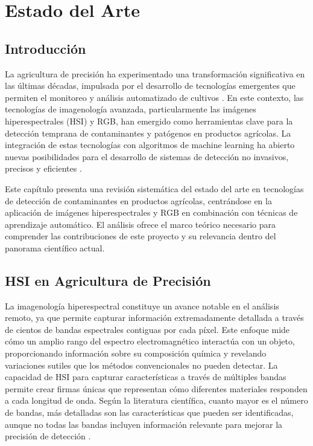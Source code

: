 \chapter{Estado del Arte}

\section{Introducción}

La agricultura de precisión ha experimentado una transformación significativa en las últimas décadas, impulsada por el desarrollo de tecnologías emergentes que permiten el monitoreo y análisis automatizado de cultivos \cite{CISTERNAS2020105626, KHAN2022101678}. En este contexto, las tecnologías de imagenología avanzada, particularmente las imágenes hiperespectrales (HSI) y RGB, han emergido como herramientas clave para la detección temprana de contaminantes y patógenos en productos agrícolas. La integración de estas tecnologías con algoritmos de machine learning ha abierto nuevas posibilidades para el desarrollo de sistemas de detección no invasivos, precisos y eficientes \cite{KHAN2022101678, jimaging5050052, agriengineering6040225}. 
    
Este capítulo presenta una revisión sistemática del estado del arte en tecnologías de detección de contaminantes en productos agrícolas, centrándose en la aplicación de imágenes hiperespectrales y RGB en combinación con técnicas de aprendizaje automático. El análisis ofrece el marco teórico necesario para comprender las contribuciones de este proyecto y su relevancia dentro del panorama científico actual.

\section{HSI en Agricultura de Precisión}

La imagenología hiperespectral constituye un avance notable en el análisis remoto, ya que permite capturar información extremadamente detallada a través de cientos de bandas espectrales contiguas por cada píxel. Este enfoque mide cómo un amplio rango del espectro electromagnético interactúa con un objeto, proporcionando información sobre su composición química y revelando variaciones sutiles que los métodos convencionales no pueden detectar. La capacidad de HSI para capturar características a través de múltiples bandas permite crear firmas únicas que representan cómo diferentes materiales responden a cada longitud de onda. Según la literatura científica, cuanto mayor es el número de bandas, más detalladas son las características que pueden ser identificadas, aunque no todas las bandas incluyen información relevante para mejorar la precisión de detección \cite{HONG201935}.

